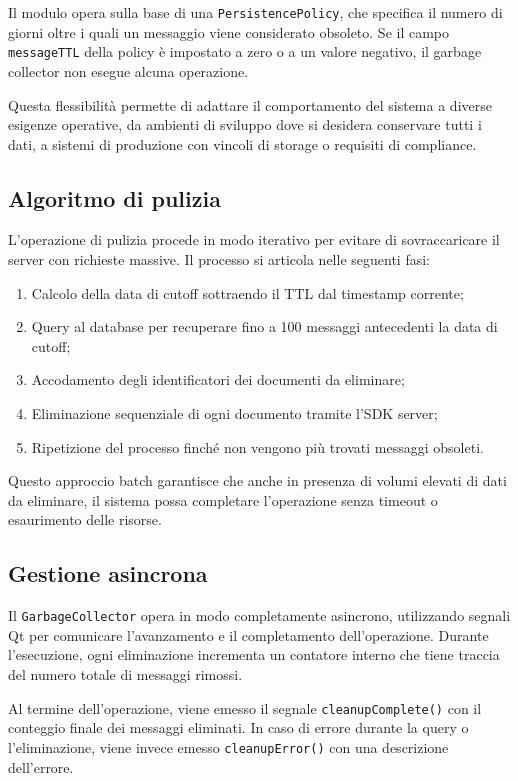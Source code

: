 \documentclass[a4paper, 11pt, twoside]{report}
\begin{document}
Il modulo opera sulla base di una \texttt{PersistencePolicy}, che specifica il numero di giorni oltre i quali un
messaggio viene considerato obsoleto. Se il campo \texttt{messageTTL} della policy è impostato a zero o a un valore
negativo, il garbage collector non esegue alcuna operazione.

Questa flessibilità permette di adattare il comportamento del sistema a diverse esigenze operative, da ambienti di
sviluppo dove si desidera conservare tutti i dati, a sistemi di produzione con vincoli di storage o requisiti di
compliance.

\subsection{Algoritmo di pulizia}

L'operazione di pulizia procede in modo iterativo per evitare di sovraccaricare il server con richieste massive.
Il processo si articola nelle seguenti fasi:

\begin{enumerate}
    \item Calcolo della data di cutoff sottraendo il TTL dal timestamp corrente;
    \item Query al database per recuperare fino a 100 messaggi antecedenti la data di cutoff;
    \item Accodamento degli identificatori dei documenti da eliminare;
    \item Eliminazione sequenziale di ogni documento tramite l'\gls{SDK} server;
    \item Ripetizione del processo finché non vengono più trovati messaggi obsoleti.
\end{enumerate}

Questo approccio batch garantisce che anche in presenza di volumi elevati di dati da eliminare, il sistema possa
completare l'operazione senza timeout o esaurimento delle risorse.

\subsection{Gestione asincrona}

Il \texttt{GarbageCollector} opera in modo completamente asincrono, utilizzando segnali Qt per comunicare l'avanzamento
e il completamento dell'operazione. Durante l'esecuzione, ogni eliminazione incrementa un contatore interno che tiene
traccia del numero totale di messaggi rimossi.

Al termine dell'operazione, viene emesso il segnale \texttt{cleanupComplete()} con il conteggio finale dei messaggi
eliminati. In caso di errore durante la query o l'eliminazione, viene invece emesso \texttt{cleanupError()} con una
descrizione dell'errore.
\end{document}
